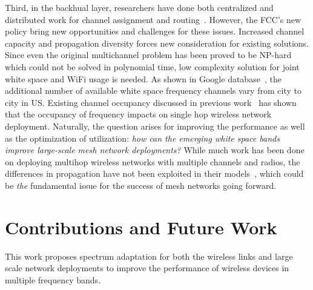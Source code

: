 Third, in the backhual layer, researchers have done both centralized and distributed work for 
channel assignment and routing~\cite{raniwala2004centralized,wu2006distributed}. However, the 
FCC's new policy bring new opportunities and challenges for these issues. Increased channel 
capacity and propagation diversity forces new consideration for existing solutions. Since even 
the original multichannel problem has been proved to be NP-hard which could not be solved in 
polynomial time, low complexity solution for joint white space and WiFi usage is needed. 
As shown in Google database~\cite{googledatabase}, the additional number of available white 
space frequency channels vary from city to city in US. Existing channel occupancy discussed 
in previous work~\cite{pcuiwinmee} has shown that the occupancy of frequency impacts on 
single hop wireless network deployment. Naturally, the question arises for improving the 
performance as well as the optimization of utilization: {\it how can the emerging white space 
bands improve large-scale mesh network deployments?}  While much work has been done on 
deploying multihop wireless networks with multiple channels and radios, the differences in 
propagation have not been exploited in their models~\cite{tang2005interference, long2013fair,doraghinejad2014channel}, 
which could be {\it the} fundamental issue for the success of mesh networks going forward.



\section{Contributions and Future Work}

This work proposes spectrum adaptation for both the wireless links and large scale 
network deployments to improve the performance of wireless devices in multiple 
frequency bands.

